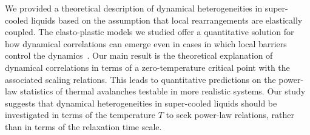 \documentclass[pre,twocolumn,superscriptaddress,tightenlines,showpacs,longbibliography,floatfix,footinbib]{revtex4-1}
\begin{document}
We provided a theoretical description of dynamical heterogeneities in super-cooled liquids based on the assumption that local rearrangements are elastically coupled. The elasto-plastic models we studied offer a quantitative solution for how dynamical correlations can emerge 
even in cases in which local barriers control the dynamics~\cite{glarum1960dielectric,dyre2006colloquium,lerbinger2022relevance,hasyim2021theory,massimo}. 
Our main result is the theoretical explanation of dynamical correlations in terms of a zero-temperature critical point with the associated scaling relations. This leads to quantitative predictions on the power-law statistics of thermal avalanches testable in more realistic systems. 
Our study suggests that dynamical heterogeneities in super-cooled liquids should be investigated in terms of the temperature $T$ to seek power-law relations, rather than in terms of the relaxation time scale. 
\end{document}
